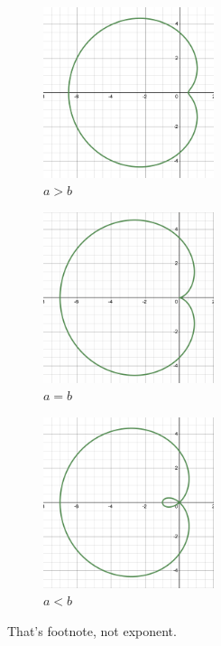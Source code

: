     \begin{multicols}{3}
    \begin{figure}[H]
        \centering
        \includegraphics[width=5cm]{Pictures/Polar Form/Bigger.png}
        \caption[]{$a>b$ \footnotemark[2]}
        \label{a>b}
    \end{figure}
    \begin{figure}[H]
        \centering
        \includegraphics[width=5cm]{Pictures/Polar Form/Equal.png}
        \caption[]{$a=b$ \footnotemark[2]}
        \label{a=b}
    \end{figure}
    \begin{figure}[H]
        \centering
        \includegraphics[width=5cm]{Pictures/Polar Form/Smaller.png}
        \caption[]{$a<b$ \footnotemark[2]}
        \label{a<b}
    \end{figure}
    \end{multicols}
    \begin{center}
        That's footnote, not exponent.
    \end{center}
    
